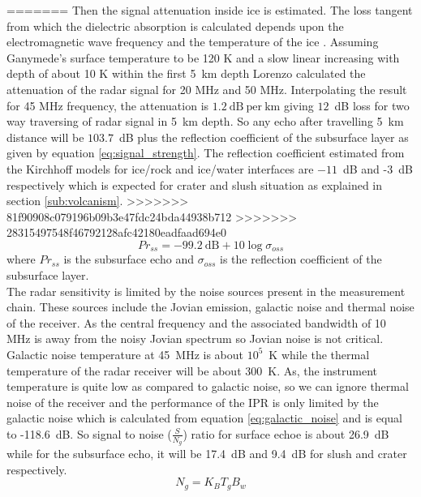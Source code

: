 =======
Then the signal attenuation inside ice is estimated. The loss tangent from which the dielectric absorption is calculated depends upon the electromagnetic wave frequency and the temperature of the ice \cite{MIMOSA}. Assuming Ganymede's surface temperature to be 120 K and a slow linear increasing with depth of about 10 K within the first 5~km depth Lorenzo\cite{Gany_SRS} calculated the attenuation of the radar signal for 20 MHz and 50 MHz. Interpolating the result for 45 MHz frequency, the attenuation is $1.2 \mathrm{~dB~per~km}$ giving $12$~dB loss for two way traversing of radar signal in 5~km depth. So any echo after travelling 5~km distance will be $103.7$~dB plus the reflection coefficient of the subsurface layer as given by equation \ref{eq:signal_strength}. The reflection coefficient estimated from the Kirchhoff models for ice/rock and ice/water interfaces are $-11$~dB and -3~dB respectively which is expected for  crater and slush situation as explained in section \ref{sub:volcanism}.
>>>>>>> 81f90908c079196b09b3e47fdc24bda44938b712
>>>>>>> 28315497548f46792128afc42180eadfaad694e0
%
\begin{equation}
Pr_{ss} = -99.2 \mathrm{~dB} + 10 \log \sigma_{oss}
\label{eq:signal_strength}
\end{equation}
where $Pr_{ss}$ is the subsurface echo and $\sigma_{oss}$ is the reflection coefficient of the subsurface layer.\\
The radar sensitivity is limited by the noise sources present in the measurement chain. These sources include the Jovian emission, galactic noise and thermal noise of the receiver.  As the central frequency and the associated bandwidth of 10~ MHz is away from the noisy Jovian spectrum so Jovian noise is not critical. Galactic noise temperature at 45~MHz is about $10^{5}$~K while the thermal temperature of the radar receiver will be about  300~K. As, the instrument temperature is quite low as compared to galactic noise, so we can ignore thermal noise of the receiver and the performance of the \ac{IPR} is only limited by the galactic noise which is calculated from equation \ref{eq:galactic_noise} and is equal to -118.6~dB. So signal to noise ($\frac{S}{N_{g}}$) ratio for surface echoe is about 26.9~dB while for the subsurface echo, it will be 17.4~dB and 9.4~dB for slush and crater respectively.
\begin{equation}
N_{g} = K_{B}T_{g}B_{w}
\label{eq:galactic_noise}
\end{equation}
\\
%
%
